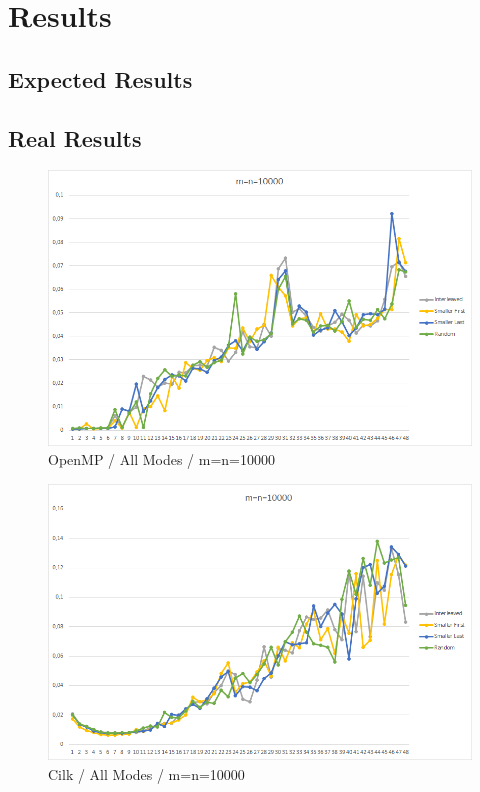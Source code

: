 \documentclass[12pt,a4paper,titlepage,oneside]{scrartcl}
\begin{document}
\section{Results}


\subsection{Expected Results}



\subsection{Real Results}

\begin{figure}[h]
\includegraphics[width=\linewidth]{Saturn_OpenMP_10000}
\caption{OpenMP / All Modes / m=n=10000}
\end{figure}

\begin{figure}[h]
\includegraphics[width=\linewidth]{Saturn_Cilk_10000}
\caption{Cilk / All Modes / m=n=10000}
\end{figure}
\end{document}
